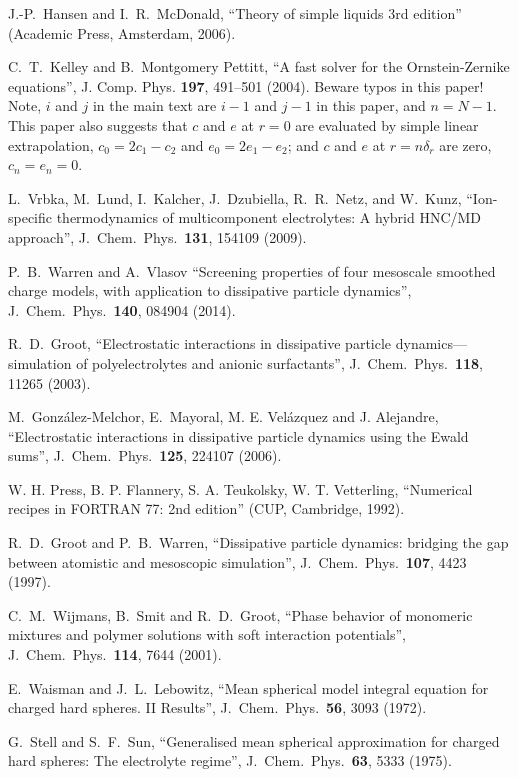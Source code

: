 \documentclass[12pt,a4paper]{article}
\begin{document}
 J.-P.~Hansen and I.~R.~McDonald, ``Theory of simple
  liquids 3rd edition'' (Academic Press, Amsterdam, 2006).

 C.~T.~Kelley and B.~Montgomery Pettitt, ``A fast
  solver for the Ornstein-Zernike equations'',
  J. Comp. Phys. {\bf197}, 491--501 (2004).  Beware typos in this
  paper!  Note, $i$ and $j$ in the main text are $i-1$ and $j-1$ in
  this paper, and $n = N-1$.  This paper also suggests that $c$ and
  $e$ at $r = 0$ are evaluated by simple linear extrapolation, $c_0 =
  2 c_1 - c_2$ and $e_0 = 2 e_1 - e_2$; and $c$ and $e$ at $r =
  n\delta_r$ are zero, $c_n = e_n = 0$.

 L.~Vrbka, M.~Lund, I.~Kalcher, J.~Dzubiella,
  R.~R.~Netz, and W.~Kunz, ``Ion-specific thermodynamics of
  multicomponent electrolytes: A hybrid HNC/MD approach'',
  J.\ Chem.\ Phys.\ {\bf131}, 154109 (2009).
  
 P.~B.~Warren and A.~Vlasov ``Screening properties of
  four mesoscale smoothed charge models, with application to
  dissipative particle dynamics'', J.\ Chem.\ Phys.\ {\bf140}, 084904
  (2014).

R.~D.~Groot, ``Electrostatic interactions in
  dissipative particle dynamics---simulation of polyelectrolytes and
  anionic surfactants'', J.\ Chem.\ Phys.\ {\bf118}, 11265 (2003).

M.~Gonz\'alez-Melchor, E.~Mayoral, M. E. Vel\'azquez
  and J. Alejandre, ``Electrostatic interactions in dissipative
  particle dynamics using the Ewald sums'', J.\ Chem.\ Phys.\ {\bf125},
  224107 (2006).

 W. H. Press, B. P. Flannery, S. A. Teukolsky,
  W. T. Vetterling, ``Numerical recipes in FORTRAN 77: 2nd edition''
  (CUP, Cambridge, 1992).

 R.~D.~Groot and P.~B.~Warren, ``Dissipative particle
  dynamics: bridging the gap between atomistic and mesoscopic
  simulation'', J.\ Chem.\ Phys.\ {\bf107}, 4423 (1997).

 C.~M.~Wijmans, B.~Smit and R.~D.~Groot, ``Phase
  behavior of monomeric mixtures and polymer solutions with soft
  interaction potentials'', J.\ Chem.\ Phys.\ {\bf114}, 7644 (2001).

 E.~Waisman and J.~L.~Lebowitz, ``Mean spherical model
  integral equation for charged hard spheres. II Results'',
  J.\ Chem.\ Phys.\ {\bf56}, 3093 (1972).

 G.~Stell and S.~F.~Sun, ``Generalised mean spherical
  approximation for charged hard spheres: The electrolyte regime'',
  J.\ Chem.\ Phys.\ {\bf63}, 5333 (1975).
\end{document}
